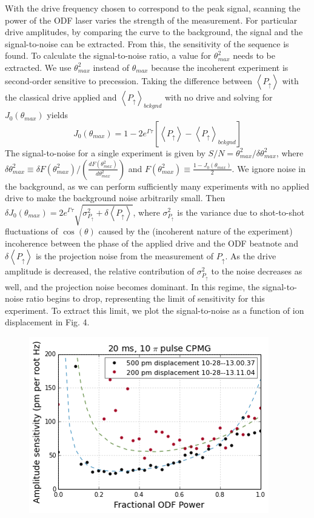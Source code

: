 \documentclass[aps,prl,twocolumn,groupedaddress,floatfix]{revtex4-1}
\begin{document}
With the drive frequency chosen to correspond to the peak signal, scanning the power of the ODF laser varies the strength of the measurement. For particular drive amplitudes, by comparing the curve to the background, the signal and the signal-to-noise can be extracted. From this, the sensitivity of the sequence is found. To calculate the signal-to-noise ratio, a value for $\theta^{2}_{max}$ needs to be extracted. We use $\theta^{2}_{max}$ instead of $\theta_{max}$ because the incoherent experiment is second-order sensitive to precession. Taking the difference between $\left< P_{\uparrow} \right>$ with the classical drive applied and $\left< P_{\uparrow} \right>_{bckgnd}$ with no drive and solving for $J_0(\theta_{max})$ yields
\[J_0(\theta_{max}) = 1 - 2e^{\Gamma \tau} \left[ \left< P_{\uparrow} \right> - \left< P_{\uparrow} \right>_{bckgnd} \right] \]
The signal-to-noise for a single experiment is given by $S/N =\theta_{max}^{2}/\delta \theta_{max}^{2}$, where $\delta \theta_{max}^{2} \equiv \delta F(\theta_{max}^{2})/ \left( \frac{dF(\theta_{max}^{2})}{d\theta_{max}^{2}} \right)$ and  $F(\theta_{max}^{2}) \equiv \frac{1-J_0(\theta_{max})}{2}$. We ignore noise in the background, as we can perform sufficiently many experiments with no applied drive to make the background noise arbitrarily small. Then $\delta J_0(\theta_{max}) = 2e^{\Gamma \tau} \sqrt{\sigma^{2}_{P_{\uparrow}} + \delta \left< P_{\uparrow} \right>}$, where $\sigma^{2}_{P_{\uparrow}}$ is the variance due to shot-to-shot fluctuations of $\cos(\theta)$ caused by the (incoherent nature of the experiment) incoherence between the phase of the applied drive and the ODF beatnote and $\delta \left< P_{\uparrow} \right>$ is the projection noise from the measurement of $P_{\uparrow}$. As the drive amplitude is decreased, the relative contribution of $\sigma^{2}_{P_{\uparrow}}$ to the noise decreases as well, and the projection noise becomes dominant. In this regime, the signal-to-noise ratio begins to drop, representing the limit of sensitivity for this experiment. To extract this limit, we plot the signal-to-noise as a function of ion displacement in Fig. 4. 
\begin{figure}[h]
\includegraphics[width=.25\textwidth]{amp_sense_both}
\caption{}\label{Fig 4}
\end{figure}
\end{document}
